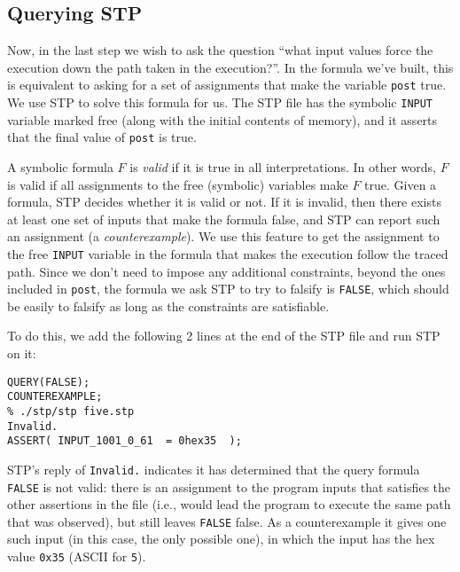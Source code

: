 \subsection {Querying STP}

Now, in the last step we wish to ask the question ``what input values
force the execution down the path taken in the execution?''.  In the
formula we've built, this is equivalent to asking for a set of
assignments that make the variable \verb'post' true. We use STP to
solve this formula for us.  The STP file has the symbolic
\verb'INPUT' variable marked free (along with the initial contents of
memory), and it asserts that the final value of {\tt post} is true.

A symbolic formula $F$ is \emph{valid} if it is true in all
interpretations.  In other words, $F$ is valid if all assignments to
the free (symbolic) variables make $F$ true. Given a formula, STP
decides whether it is valid or not. If it is invalid, then there
exists at least one set of inputs that make the formula false, and
STP can report such an assignment (a {\em counterexample}). We use
this feature to get the assignment to the free \verb'INPUT' variable
in the formula that makes the execution follow the traced path.
Since we don't need to impose any additional constraints, beyond the
ones included in {\tt post}, the formula we ask STP to try to falsify
is {\tt FALSE}, which should be easily to falsify as long as the
constraints are satisfiable.

To do this, we add the following 2 lines at the end of the STP file
and run STP on it:

\begin{Verbatim}[frame=lines, framesep=.5em]
% cat >>five.stp
QUERY(FALSE);
COUNTEREXAMPLE;
% ./stp/stp five.stp
Invalid.
ASSERT( INPUT_1001_0_61  = 0hex35  );
\end{Verbatim}

STP's reply of \verb'Invalid.' indicates it has determined that the
query formula \verb'FALSE' is not valid: there is an assignment to the
program inputs that satisfies the other assertions in the file (i.e.,
would lead the program to execute the same path that was observed),
but still leaves \verb'FALSE' false. As a counterexample it gives one
such input (in this case, the only possible one), in which the input
has the hex value \verb'0x35' (ASCII for \texttt{5}).


